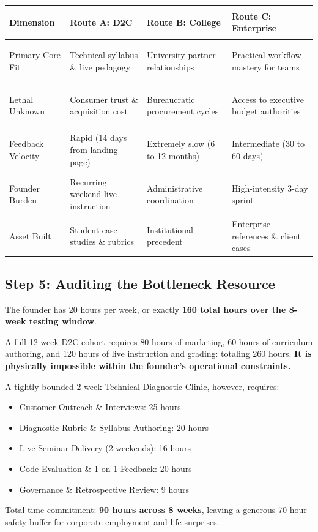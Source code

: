 \begin{tcolorbox}[
  enhanced,
  colback=BayesSurface!60,
  colframe=BayesBorder,
  boxrule=0.5pt,
  arc=3pt,
  left=3pt,right=3pt,top=3pt,bottom=3pt,
  boxsep=1pt
]
\scriptsize
\begin{tabularx}{\linewidth}{>{\bfseries\raggedright\arraybackslash}p{1.6cm} X X X}
\toprule
\textbf{Dimension} & \textbf{Route A: D2C} & \textbf{Route B: College} & \textbf{Route C: Enterprise} \\
\midrule
Primary Core Fit & Technical syllabus \& live pedagogy & University partner relationships & Practical workflow mastery for teams \\
\addlinespace[2pt]
Lethal Unknown & Consumer trust \& acquisition cost & Bureaucratic procurement cycles & Access to executive budget authorities \\
\addlinespace[2pt]
Feedback Velocity & Rapid (14 days from landing page) & Extremely slow (6 to 12 months) & Intermediate (30 to 60 days) \\
\addlinespace[2pt]
Founder Burden & Recurring weekend live instruction & Administrative coordination & High-intensity 3-day sprint \\
\addlinespace[2pt]
Asset Built & Student case studies \& rubrics & Institutional precedent & Enterprise references \& client cases \\
\bottomrule
\end{tabularx}
\end{tcolorbox}

\subsection{Step 5: Auditing the Bottleneck Resource}

The founder has 20 hours per week, or exactly \textbf{160 total hours over the 8-week testing window}.

A full 12-week D2C cohort requires 80 hours of marketing, 60 hours of curriculum authoring, and 120 hours of live instruction and grading: totaling 260 hours. \textbf{It is physically impossible within the founder's operational constraints.}

A tightly bounded 2-week Technical Diagnostic Clinic, however, requires:
\begin{itemize}[leftmargin=10pt,itemsep=1pt,topsep=1pt]
  \item Customer Outreach \& Interviews: 25 hours
  \item Diagnostic Rubric \& Syllabus Authoring: 20 hours
  \item Live Seminar Delivery (2 weekends): 16 hours
  \item Code Evaluation \& 1-on-1 Feedback: 20 hours
  \item Governance \& Retrospective Review: 9 hours
\end{itemize}
Total time commitment: \textbf{90 hours across 8 weeks}, leaving a generous 70-hour safety buffer for corporate employment and life surprises.


